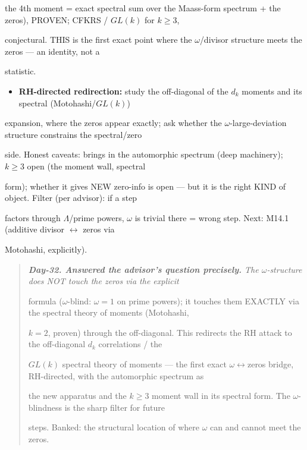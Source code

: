 \documentclass[10pt]{article}
\begin{document}
  the 4th moment = exact spectral sum over the Maass-form spectrum + the zeros), PROVEN; CFKRS / $GL(k)$ for $k\ge3$,\par
  conjectural. THIS is the first exact point where the \ensuremath{\omega}/divisor structure meets the zeros --- an identity, not a\par
  statistic.\par
\begin{itemize}
\item \textbf{RH-directed redirection:} study the off-diagonal of the $d_k$ moments and its spectral (Motohashi/$GL(k)$)
\end{itemize}
  expansion, where the zeros appear exactly; ask whether the \ensuremath{\omega}-large-deviation structure constrains the spectral/zero\par
  side. Honest caveats: brings in the automorphic spectrum (deep machinery); $k\ge3$ open (the moment wall, spectral\par
  form); whether it gives NEW zero-info is open --- but it is the right KIND of object. Filter (per advisor): if a step\par
  factors through $\Lambda$/prime powers, \ensuremath{\omega} is trivial there = wrong step. Next: M14.1 (additive divisor \ensuremath{\leftrightarrow} zeros via\par
  Motohashi, explicitly).\par

\begin{quote}\itshape
\textbf{Day-32. Answered the advisor's question precisely.} The \ensuremath{\omega}-structure does NOT touch the zeros via the explicit\par
formula (\ensuremath{\omega}-blind: $\omega=1$ on prime powers); it touches them EXACTLY via the spectral theory of moments (Motohashi,\par
$k=2$, proven) through the off-diagonal. This redirects the RH attack to the off-diagonal $d_k$ correlations / the\par
$GL(k)$ spectral theory of moments --- the first exact \ensuremath{\omega}\ensuremath{\leftrightarrow}zeros bridge, RH-directed, with the automorphic spectrum as\par
the new apparatus and the $k\ge3$ moment wall in its spectral form. The \ensuremath{\omega}-blindness is the sharp filter for future\par
steps. Banked: the structural location of where \ensuremath{\omega} can and cannot meet the zeros.\par
\end{quote}
\end{document}
